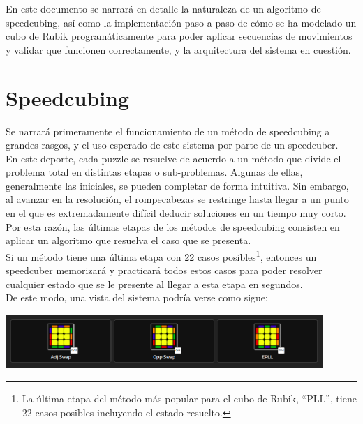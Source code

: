\begin{multicols}{2}
En este documento se narrará en detalle la naturaleza de un algoritmo de speedcubing, así como la implementación paso a paso de cómo se ha modelado un cubo de Rubik programáticamente para poder aplicar secuencias de movimientos y validar que funcionen correctamente, y la arquitectura del sistema en cuestión.

\section{Speedcubing}

Se narrará primeramente el funcionamiento de un método de speedcubing a grandes rasgos, y el uso esperado de este sistema por parte de un speedcuber.\\

En este deporte, cada puzzle se resuelve de acuerdo a un método que divide el problema total en distintas etapas o sub-problemas. Algunas de ellas, generalmente las iniciales, se pueden completar de forma intuitiva. Sin embargo, al avanzar en la resolución, el rompecabezas se restringe hasta llegar a un punto en el que es extremadamente difícil deducir soluciones en un tiempo muy corto. Por esta razón, las últimas etapas de los métodos de speedcubing consisten en aplicar un algoritmo que resuelva el caso que se presenta.\\

Si un método tiene una última etapa con 22 casos posibles\footnote{La última etapa del método más popular para el cubo de Rubik, ``PLL'', tiene 22 casos posibles incluyendo el estado resuelto.}, entonces un speedcuber memorizará y practicará todos estos casos para poder resolver cualquier estado que se le presente al llegar a esta etapa en segundos.\\

De este modo, una vista del sistema podría verse como sigue:\\

\begin{Figure}
\centering
    \includegraphics[width=0.9\textwidth]{img/plls_speedcubedb.png}
 \label{fig:pll-speedcubedb}
\end{Figure}


\end{multicols}
